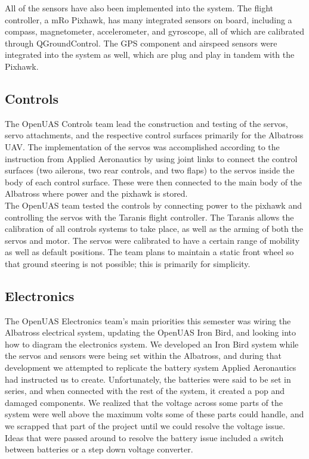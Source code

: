 \documentclass{article}
\begin{document}
\noindent All of the sensors have also been implemented into the system. The flight controller, a mRo Pixhawk, has many integrated sensors on board, including a compass, magnetometer, accelerometer, and gyroscope, all of which are calibrated through QGroundControl. The GPS component and airspeed sensors were integrated into the system as well, which are plug and play in tandem with the Pixhawk. \\

\subsection{Controls}
\noindent The OpenUAS Controls team lead the construction and testing of the servos, servo attachments, and the respective control surfaces primarily for the Albatross UAV. The implementation of the servos was accomplished according to the instruction from Applied Aeronautics by using joint links to connect the control surfaces (two ailerons, two rear controls, and two flaps) to the servos inside the body of each control surface. These were then connected to the main body of the Albatross where power and the pixhawk is stored. \\

\noindent The OpenUAS team tested the controls by connecting power to the pixhawk and controlling the servos with the Taranis flight controller. The Taranis allows the calibration of all controls systems to take place, as well as the arming of both the servos and motor. The servos were calibrated to have a certain range of mobility as well as default positions. The team plans to maintain a static front wheel so that ground steering is not possible; this is primarily for simplicity. \\

\subsection{Electronics}

\noindent The OpenUAS Electronics team's main priorities this semester was wiring the Albatross electrical system, updating the OpenUAS Iron Bird, and looking into how to diagram the electronics system. We developed an Iron Bird system while the servos and sensors were being set within the Albatross, and during that development we attempted to replicate the battery system Applied Aeronautics had instructed us to create. Unfortunately, the batteries were said to be set in series, and when connected with the rest of the system, it created a pop and damaged components. We realized that the voltage across some parts of the system were well above the maximum volts some of these parts could handle, and we scrapped that part of the project until we could resolve the voltage issue. Ideas that were passed around to resolve the battery issue included a switch between batteries or a step down voltage converter. \\
\end{document}

